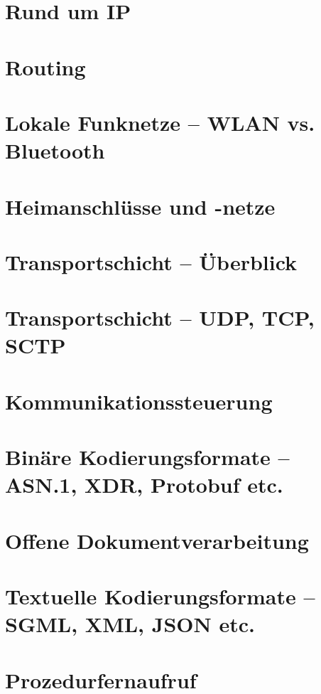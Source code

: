\documentclass[hidelinks]{article}
\begin{document}
\section{Rund um IP}

\section{Routing}

\section{Lokale Funknetze -- WLAN vs. Bluetooth}

\section{Heimanschlüsse und -netze}

\section{Transportschicht -- Überblick}

\section{Transportschicht -- UDP, TCP, SCTP}

\section{Kommunikationssteuerung}

\section{Binäre Kodierungsformate -- ASN.1, XDR, Protobuf etc.}

\section{Offene Dokumentverarbeitung}

\section{Textuelle Kodierungsformate -- SGML, XML, JSON etc.}

\section{Prozedurfernaufruf}
\end{document}
